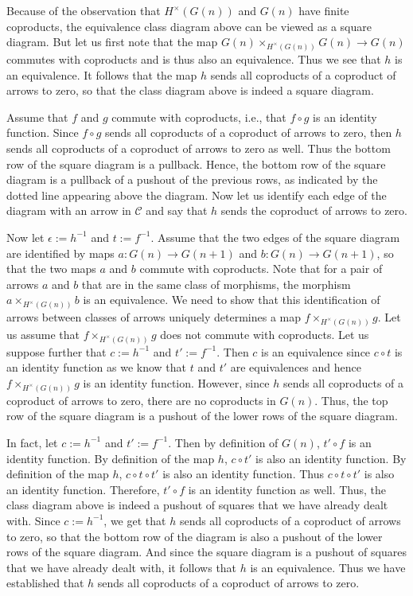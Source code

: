 \documentclass[a4paper,reqno,oneside]{article}
\begin{document}
Because of the observation that $H^{\times}(G(n))$ and $G(n)$ have finite coproducts, the equivalence class diagram above can be viewed as a square diagram. But let us first note that the map $G(n) \times_{H^{\times}(G(n))} G(n) \rightarrow G(n)$ commutes with coproducts and is thus also an equivalence. Thus we see that $h$ is an equivalence. It follows that the map $h$ sends all coproducts of a coproduct of arrows to zero, so that the class diagram above is indeed a square diagram.

Assume that $f$ and $g$ commute with coproducts, i.e., that $f \circ g$ is an identity function. Since $f \circ g$ sends all coproducts of a coproduct of arrows to zero, then $h$ sends all coproducts of a coproduct of arrows to zero as well. Thus the bottom row of the square diagram is a pullback. Hence, the bottom row of the square diagram is a pullback of a pushout of the previous rows, as indicated by the dotted line appearing above the diagram. Now let us identify each edge of the diagram with an arrow in $\mathcal{C}$ and say that $h$ sends the coproduct of arrows to zero.

Now let $\epsilon := h^{-1}$ and $t := f^{-1}$. Assume that the two edges of the square diagram are identified by maps $a: G(n) \rightarrow G(n + 1)$ and $b: G(n) \rightarrow G(n + 1)$, so that the two maps $a$ and $b$ commute with coproducts. Note that for a pair of arrows $a$ and $b$ that are in the same class of morphisms, the morphism $a \times_{H^{\times}(G(n))} b$ is an equivalence. We need to show that this identification of arrows between classes of arrows uniquely determines a map $f \times_{H^{\times}(G(n))} g$. Let us assume that $f \times_{H^{\times}(G(n))} g$ does not commute with coproducts. Let us suppose further that $c := h^{-1}$ and $t' := f^{-1}$. Then $c$ is an equivalence since $c \circ t$ is an identity function as we know that $t$ and $t'$ are equivalences and hence $f \times_{H^{\times}(G(n))} g$ is an identity function. However, since $h$ sends all coproducts of a coproduct of arrows to zero, there are no coproducts in $G(n)$. Thus, the top row of the square diagram is a pushout of the lower rows of the square diagram. 

In fact, let $c := h^{-1}$ and $t' := f^{-1}$. Then by definition of $G(n)$, $t' \circ f$ is an identity function. By definition of the map $h$, $c \circ t'$ is also an identity function. By definition of the map $h$, $c \circ t \circ t'$ is also an identity function. Thus $c \circ t \circ t'$ is also an identity function. Therefore, $t' \circ f$ is an identity function as well. Thus, the class diagram above is indeed a pushout of squares that we have already dealt with. Since $c := h^{-1}$, we get that $h$ sends all coproducts of a coproduct of arrows to zero, so that the bottom row of the diagram is also a pushout of the lower rows of the square diagram. And since the square diagram is a pushout of squares that we have already dealt with, it follows that $h$ is an equivalence. Thus we have established that $h$ sends all coproducts of a coproduct of arrows to zero. 
\end{document}
